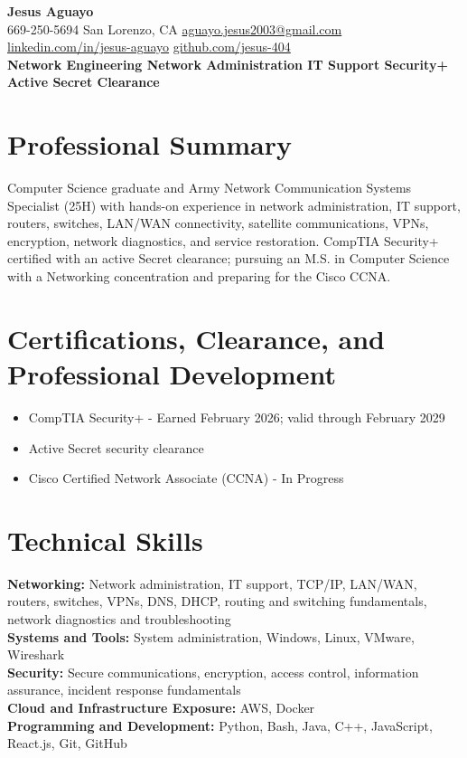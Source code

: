 \documentclass[letterpaper,10pt]{article}
\begin{document}
\begin{center}
  {\LARGE\bfseries Jesus Aguayo}\\[2pt]
  \small
  669-250-5694 \textbar{} San Lorenzo, CA \textbar{}
  \href{mailto:aguayo.jesus2003@gmail.com}{aguayo.jesus2003@gmail.com}\\[1pt]
  \href{https://www.linkedin.com/in/jesus-aguayo/}{linkedin.com/in/jesus-aguayo} \textbar{}
  \href{https://github.com/jesus-404}{github.com/jesus-404}\\[2pt]
  \textbf{Network Engineering \textbar{} Network Administration \textbar{} IT Support \textbar{} Security+ \textbar{} Active Secret Clearance}
\end{center}

\section{Professional Summary}
\small
Computer Science graduate and Army Network Communication Systems Specialist (25H) with hands-on experience in network administration, IT support, routers, switches, LAN/WAN connectivity, satellite communications, VPNs, encryption, network diagnostics, and service restoration. CompTIA Security+ certified with an active Secret clearance; pursuing an M.S. in Computer Science with a Networking concentration and preparing for the Cisco CCNA.

\section{Certifications, Clearance, and Professional Development}
\begin{itemize}
  \item CompTIA Security+ - Earned February 2026; valid through February 2029
  \item Active Secret security clearance
  \item Cisco Certified Network Associate (CCNA) - In Progress
\end{itemize}

\section{Technical Skills}
\small
\textbf{Networking:} Network administration, IT support, TCP/IP, LAN/WAN, routers, switches, VPNs, DNS, DHCP, routing and switching fundamentals, network diagnostics and troubleshooting\\
\textbf{Systems and Tools:} System administration, Windows, Linux, VMware, Wireshark\\
\textbf{Security:} Secure communications, encryption, access control, information assurance, incident response fundamentals\\
\textbf{Cloud and Infrastructure Exposure:} AWS, Docker\\
\textbf{Programming and Development:} Python, Bash, Java, C++, JavaScript, React.js, Git, GitHub
\end{document}
